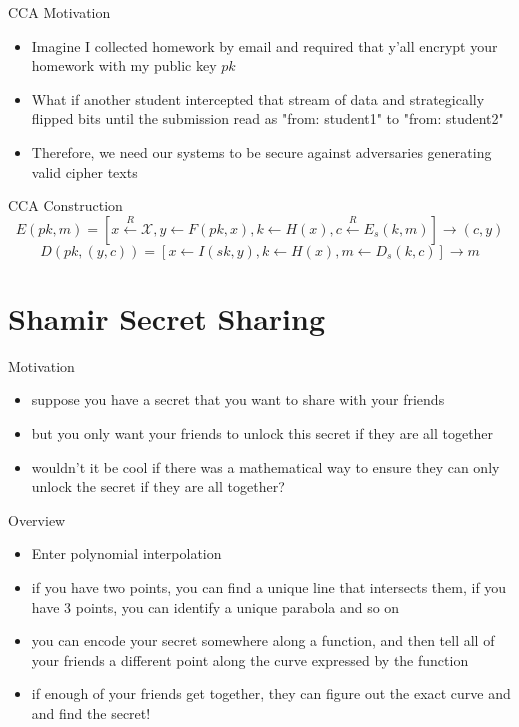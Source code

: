 \documentclass[handout]{beamer}
\begin{document}
\begin{frame}{CCA Motivation}
  \begin{itemize}
    \item \pause Imagine I collected homework by email and required that y'all encrypt your homework with my public key \(pk\)
    \item \pause What if another student intercepted that stream of data and strategically flipped bits until the submission read as "from: student1" to "from: student2"
    \item \pause Therefore, we need our systems to be secure against adversaries generating valid cipher texts
  \end{itemize}
\end{frame}

\begin{frame}{CCA Construction}
  \pause
  \[E(pk, m) = [x \xleftarrow[]{R} \mathcal{X}, y \leftarrow F(pk, x), k \leftarrow H(x), c \xleftarrow[]{R} E_s(k, m)] \rightarrow (c, y)\]
  \pause
  \[D(pk, (y, c)) = [x \leftarrow I(sk, y), k \leftarrow H(x), m \leftarrow D_s(k,c) ]\rightarrow m\]
\end{frame}

\section{Shamir Secret Sharing}

\begin{frame}{Motivation}
  \begin{itemize}
    \item \pause suppose you have a secret that you want to share with your friends
    \item \pause but you only want your friends to unlock this secret if they are all together
    \item \pause wouldn't it be cool if there was a mathematical way to ensure they can only unlock the secret if they are all together?
  \end{itemize}
\end{frame}

\begin{frame}{Overview}
  \begin{itemize}
    \item \pause Enter polynomial interpolation
    \item \pause if you have two points, you can find a unique line that intersects them, if you have 3 points, you can identify a unique parabola and so on
    \item \pause you can encode your secret somewhere along a function, and then tell all of your friends a different point along the curve expressed by the function
    \item \pause if enough of your friends get together, they can figure out the exact curve and and find the secret!
  \end{itemize}
\end{frame}
\end{document}
